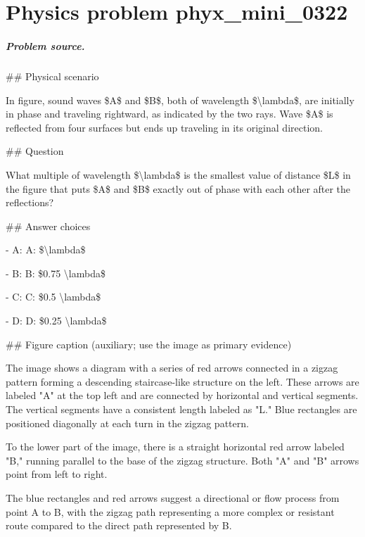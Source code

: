 
\chapter{Physics problem phyx\_mini\_0322}
\label{ch:PhyXMiniProblems_problem_phyx_mini_0322}

\paragraph{Problem source.}
\#\# Physical scenario

In figure, sound waves \$A\$ and \$B\$, both of wavelength \$\textbackslash{}lambda\$, are initially in phase and traveling rightward, as indicated by the two rays. Wave \$A\$ is reflected from four surfaces but ends up traveling in its original direction.

\#\# Question

What multiple of wavelength \$\textbackslash{}lambda\$ is the smallest value of distance \$L\$ in the figure that puts \$A\$ and \$B\$ exactly out of phase with each other after the reflections?

\#\# Answer choices

- A: A: \$\textbackslash{}lambda\$

- B: B: \$0.75 \textbackslash{}lambda\$

- C: C: \$0.5 \textbackslash{}lambda\$

- D: D: \$0.25 \textbackslash{}lambda\$

\#\# Figure caption (auxiliary; use the image as primary evidence)

The image shows a diagram with a series of red arrows connected in a zigzag pattern forming a descending staircase-like structure on the left. These arrows are labeled "A" at the top left and are connected by horizontal and vertical segments. The vertical segments have a consistent length labeled as "L." Blue rectangles are positioned diagonally at each turn in the zigzag pattern.

To the lower part of the image, there is a straight horizontal red arrow labeled "B," running parallel to the base of the zigzag structure. Both "A" and "B" arrows point from left to right.

The blue rectangles and red arrows suggest a directional or flow process from point A to B, with the zigzag path representing a more complex or resistant route compared to the direct path represented by B.

